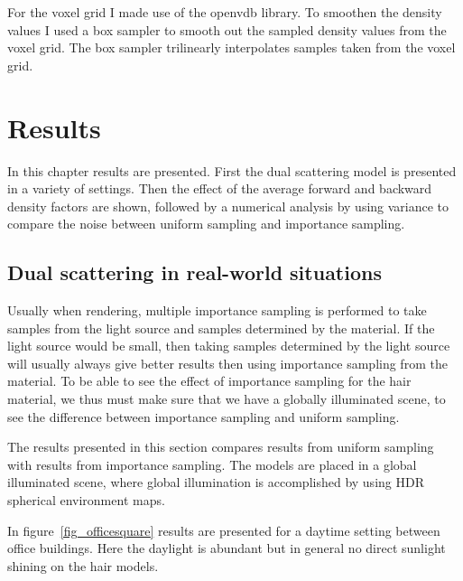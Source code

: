 \documentclass[11pt,a4paper]{report}
\begin{document}
For the voxel grid I made use of the openvdb library. To smoothen the density values I used a box sampler to smooth out the sampled density values from the voxel grid. The box sampler trilinearly interpolates samples taken from the voxel grid.


\chapter{Results}

In this chapter results are presented. First the dual scattering model is presented in a variety of settings. Then the effect of the average forward and backward density factors are shown, followed by a numerical analysis by using variance to compare the noise between uniform sampling and importance sampling.



%
%

\section{Dual scattering in real-world situations}

Usually when rendering, multiple importance sampling is performed to take samples from the light source and samples determined by the material. If the light source would be small, then taking samples determined by the light source will usually always give better results then using importance sampling from the material. To be able to see the effect of importance sampling for the hair material, we thus must make sure that we have a globally illuminated scene, to see the difference between importance sampling and uniform sampling.

The results presented in this section compares results from uniform sampling with results from importance sampling. The models are placed in a global illuminated scene, where global illumination is accomplished by using HDR spherical environment maps.

In figure~\ref{fig_officesquare} results are presented for a daytime setting between office buildings. Here the daylight is abundant but in general no direct sunlight shining on the hair models. 
\end{document}
